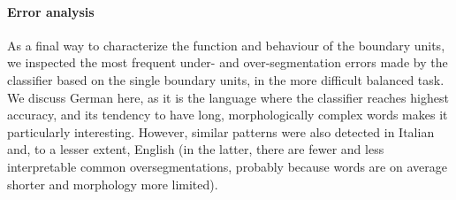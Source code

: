 %


\paragraph{Error analysis} As a final way to characterize the function
and behaviour of the boundary units, we inspected the most frequent
under- and over-segmentation errors made by the classifier based on
the single boundary units, in the more difficult balanced task. We
discuss German here, as it is the language where the classifier
reaches highest accuracy, and its tendency to have long,
morphologically complex words makes it particularly
interesting. However, similar patterns were also detected in Italian
and, to a lesser extent, English (in the latter, there are fewer and
less interpretable common oversegmentations, probably because words
are on average shorter and morphology more limited).

